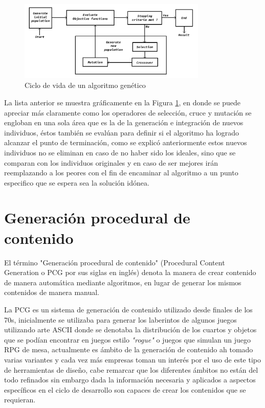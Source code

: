 \begin{figure}
    \centering
    \includegraphics[width=0.8\textwidth]{img/ga_life_cycle.png}
    \caption{Ciclo de vida de un algoritmo genético}
    \label{figure:GA-Cycle}
\end{figure}

La lista anterior se muestra gráficamente en la Figura \ref{figure:GA-Cycle}, en
donde se puede apreciar más claramente como los operadores de selección, cruce y
mutación se engloban en una sola área que es la de la generación e integración
de nuevos individuos, éstos  también se evalúan para definir si el algoritmo ha
logrado alcanzar el punto de terminación, como
se explicó anteriormente estos nuevos individuos no se eliminan en caso de no
haber sido los ideales, sino que se comparan con los individuos originales y en
caso de ser mejores irán reemplazando a los peores con el fin de encaminar al
algoritmo a un punto especifico que se espera sea la solución idónea.

\section{Generación procedural de contenido}
\label{section:PCG}

El término "Generación procedural de contenido" (Procedural Content Generation o
PCG por sus siglas en inglés) denota la manera de crear contenido de manera
automática mediante algoritmos, en lugar de generar los mismos contenidos de
manera manual. %


La PCG es un sistema de generación de contenido utilizado desde finales de los
70s, inicialmente se utilizaba para generar los laberintos de algunos juegos
utilizando arte ASCII donde se denotaba la distribución de los cuartos y objetos
que se podían encontrar en juegos estilo \textit{"rogue"} 
o juegos que simulan %
un juego RPG de mesa, actualmente es ámbito de la generación de contenido ah
tomado varias variantes y cada vez más empresas toman un interés por el uso de
este tipo de herramientas de diseño, cabe remarcar que los diferentes ámbitos no
están del todo refinados sin embargo dada la información necesaria y aplicados a
aspectos específicos en el ciclo de desarrollo son capaces de crear los
contenidos que se requieran.


